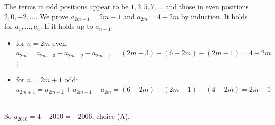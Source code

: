 The terms in odd positions appear to be $1,3,5,7,\dots$ and those in even positions $2,0,-2,\dots$. We prove $a_{2m-1}=2m-1$ and $a_{2m}=4-2m$ by induction. It holds for $a_1,\dots,a_4$. If it holds up to $a_{n-1}$:
\begin{itemize}
\item for $n=2m$ even: $a_{2m}=a_{2m-3}+a_{2m-2}-a_{2m-1}=(2m-3)+(6-2m)-(2m-1)=4-2m$;
\item for $n=2m+1$ odd: $a_{2m+1}=a_{2m-2}+a_{2m-1}-a_{2m}=(6-2m)+(2m-1)-(4-2m)=2m+1$.
\end{itemize}
So $a_{2010}=4-2010=\boxed{-2006}$, choice (A).
